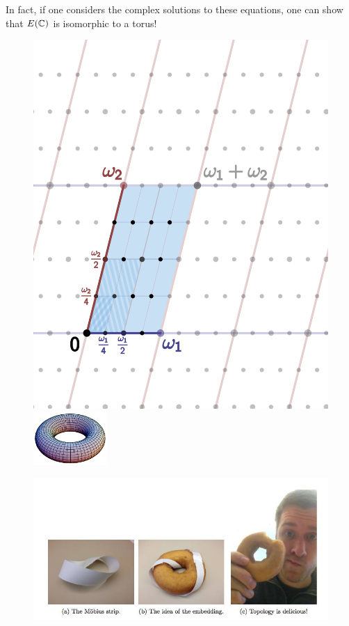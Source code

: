\begin{frame}[plain]
\scriptsize In fact, if one considers the complex solutions to these equations, one can show that $E(\mathbb{C})$ is isomorphic to a torus!

	\begin{figure}[!ht]
	\centering
	\includegraphics[width=0.25\textheight]{images/lattice.png} \qquad\qquad
	\includegraphics[width=0.25\textwidth]{images/torus.png}
	\end{figure}

	\begin{figure}[!ht]
	\centering
	\includegraphics[width=0.8\textheight]{images/delicious.jpg}
	\end{figure}
\end{frame}




